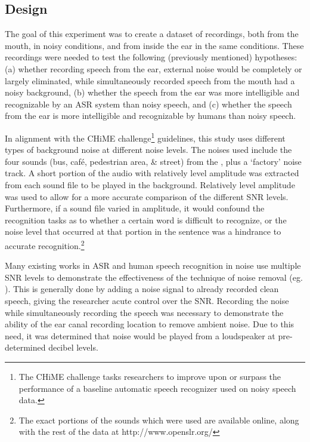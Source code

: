 \subsection{Design}
\label{chap2:methods:design}

The goal of this experiment was to create a dataset of recordings, both from the mouth, in noisy conditions, and from inside the ear in the same conditions.  These recordings were needed to test the following (previously mentioned) hypotheses: (a) whether recording speech from the ear, external noise would be completely or largely eliminated, while simultaneously recorded speech from the mouth had a noisy background, (b) whether the speech from the ear was more intelligible and recognizable by an ASR system than noisy speech, and (c) whether the speech from the ear is more intelligible and recognizable by humans than noisy speech. 

In alignment with the CHiME challenge\footnote{The CHiME challenge tasks researchers to improve upon or surpass the performance of a baseline automatic speech recognizer used on noisy speech data.} guidelines, this study uses different types of background noise at different noise levels.  The noises used include the four sounds (bus, caf\'{e}, pedestrian area, \& street) from the \cite{chime:16}, plus a `factory' noise track.  A short portion of the audio with relatively level amplitude was extracted from each sound file to be played in the background.  Relatively level amplitude was used to allow for a more accurate comparison of the different SNR levels. Furthermore, if a sound file varied in amplitude, it would confound the recognition tasks as to whether a certain word is difficult to recognize, or the noise level that occurred at that portion in the sentence was a hindrance to accurate recognition.\footnote{The exact portions of the sounds which were used are available online, along with the rest of the data at http://www.openslr.org/}

Many existing works in ASR and human speech recognition in noise use multiple SNR levels to demonstrate the effectiveness of the technique of noise removal (eg. \cite{braun:16}).  This is generally done by adding a noise signal to already recorded clean speech, giving the researcher acute control over the SNR.  Recording the noise while simultaneously recording the speech was necessary to demonstrate the ability of the ear canal recording location to remove ambient noise.  Due to this need, it was determined that noise would be played from a loudspeaker at pre-determined decibel levels.  


